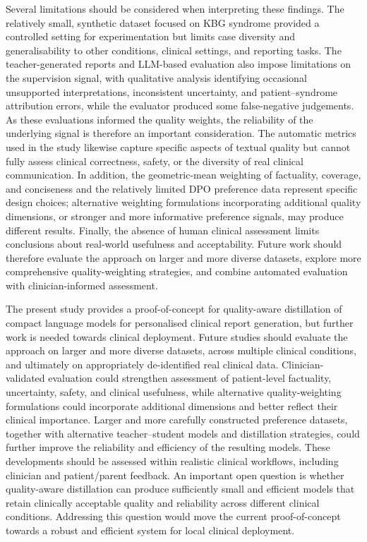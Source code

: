 \documentclass[ %
                    author={Aman Kumar Singh},
                supervisor={Dr. Edwin Simpson},
                    degree={MSc},
                     title={Quality-Aware Knowledge Distillation of Large Language Models for Efficient Personalised Clinical Report Generation},
                  subtitle={},
                      type={},
                      year={2021}]{dissertation}
\begin{document}
Several limitations should be considered when interpreting these findings.
The relatively small, synthetic dataset focused on KBG syndrome provided a
controlled setting for experimentation but limits case diversity and
generalisability to other conditions, clinical settings, and reporting tasks.
The teacher-generated reports and LLM-based evaluation also impose
limitations on the supervision signal, with qualitative analysis identifying
occasional unsupported interpretations, inconsistent uncertainty, and
patient--syndrome attribution errors, while the evaluator produced some
false-negative judgements. As these evaluations informed the quality weights,
the reliability of the underlying signal is therefore an important
consideration. The automatic metrics used in the study likewise capture
specific aspects of textual quality but cannot fully assess clinical
correctness, safety, or the diversity of real clinical communication. In
addition, the geometric-mean weighting of factuality, coverage, and
conciseness and the relatively limited DPO preference data represent specific
design choices; alternative weighting formulations incorporating additional
quality dimensions, or stronger and more informative preference signals, may
produce different results. Finally, the absence of human clinical assessment
limits conclusions about real-world usefulness and acceptability. Future work
should therefore evaluate the approach on larger and more diverse datasets,
explore more comprehensive quality-weighting strategies, and combine
automated evaluation with clinician-informed assessment.


The present study provides a proof-of-concept for quality-aware distillation
of compact language models for personalised clinical report generation, but
further work is needed towards clinical deployment. Future studies should
evaluate the approach on larger and more diverse datasets, across multiple
clinical conditions, and ultimately on appropriately de-identified real
clinical data. Clinician-validated evaluation could strengthen assessment
of patient-level factuality, uncertainty, safety, and clinical usefulness,
while alternative quality-weighting formulations could incorporate additional
dimensions and better reflect their clinical importance. Larger and more
carefully constructed preference datasets, together with alternative
teacher--student models and distillation strategies, could further improve
the reliability and efficiency of the resulting models. These developments
should be assessed within realistic clinical workflows, including clinician
and patient/parent feedback. An important open question is whether
quality-aware distillation can produce sufficiently small and efficient
models that retain clinically acceptable quality and reliability across
different clinical conditions. Addressing this question would move the
current proof-of-concept towards a robust and efficient system for local
clinical deployment.
\end{document}
